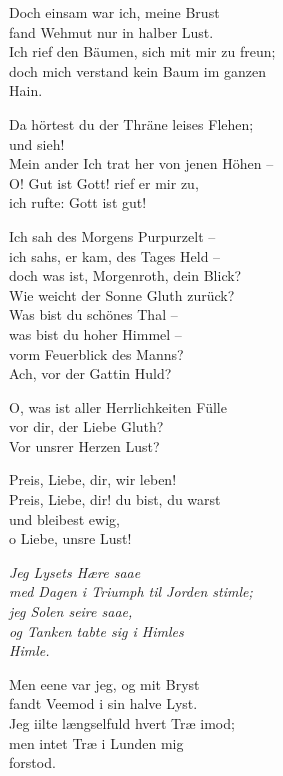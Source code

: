 \documentclass[shorttitlesize=45,tocstyle=ref]{ees}
\begin{document}
{\begin{multicols}{2}
Doch einsam war ich, meine Brust\\
fand Wehmut nur in halber Lust.\\
Ich rief den Bäumen, sich mit mir zu freun;\\
doch mich verstand kein Baum im ganzen\\
\hspace*{1em}Hain.

Da hörtest du der Thräne leises Flehen;\\
und sieh!\\
Mein ander Ich trat her von jenen Höhen –\\
O! Gut ist Gott! rief er mir zu,\\
ich rufte: Gott ist gut!

Ich sah des Morgens Purpurzelt –\\
ich sahs, er kam, des Tages Held –\\
doch was ist, Morgenroth, dein Blick?\\
Wie weicht der Sonne Gluth zurück?\\
Was bist du schönes Thal –\\
was bist du hoher Himmel –\\
vorm Feuerblick des Manns?\\
Ach, vor der Gattin Huld?

O, was ist aller Herrlichkeiten Fülle\\
vor dir, der Liebe Gluth?\\
Vor unsrer Herzen Lust?

Preis, Liebe, dir, wir leben!\\
Preis, Liebe, dir! du bist, du warst\\
und bleibest ewig,\\
o Liebe, unsre Lust!

\columnbreak\itshape
Jeg Lysets Hære saae\\
med Dagen i Triumph til Jorden stimle;\\
jeg Solen seire saae,\\
og Tanken tabte sig i Himles\\
\hspace*{1em}Himle.

Men eene var jeg, og mit Bryst\\
fandt Veemod i sin halve Lyst.\\
Jeg iilte længselfuld hvert Træ imod;\\
men intet Træ i Lunden mig\\
\hspace*{1em}forstod.


\end{multicols}}
\end{document}
